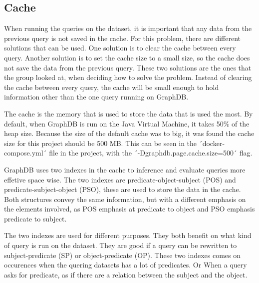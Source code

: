 \subsection{Cache}\label{sec:cache}
When running the queries on the dataset, it is important that any data from the previous query is not saved in the cache. For this problem, there are different solutions that can be used. One solution is to clear the cache between every query. Another solution is to set the cache size to a small size, so the cache does not save the data from the previous query. These two solutions are the ones that the group looked at, when deciding how to solve the problem. Instead of clearing the cache between every query, the cache will be small enough to hold information other than the one query running on GraphDB.

The cache is the memory that is used to store the data that is used the most. By default, when GraphDB is run on the Java Virtual Machine, it takes 50\% of the heap size.
Because the size of the default cache was to big, it was found the cache size for this project should be 500 MB. This can be seen in the ´docker-compose.yml´ file in the project, with the ´-Dgraphdb.page.cache.size=500´ flag.

GraphDB uses two indexes in the cache to inference and evaluate queries more effetive space wise. The two indexes are predicate-object-subject (POS) and predicate-subject-object (PSO), these are used to store the data in the cache. Both structures convey the same information, but with a different emphasis on the elements involved, as POS emphasis at predicate to object and PSO emphasis predicate to subject.

The two indexes are used for different purposes. They both benefit on what kind of query is run on the dataset. They are good if a query can be rewritten to subject-predicate (SP) or object-predicate (OP). These two indexes comes on occurences when the quering datasets has a lot of predicates. Or When a query asks for predicate, as if there are a relation between the subject and the object.

